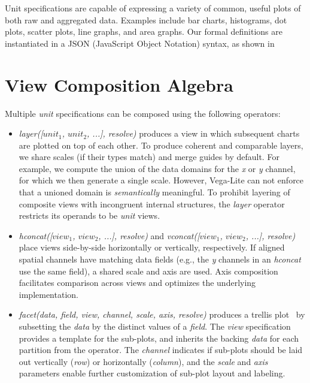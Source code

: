 Unit specifications are capable of expressing a variety of common, useful plots
of both raw and aggregated data. Examples include bar charts, histograms, dot
plots, scatter plots, line graphs, and area graphs. Our formal definitions are
instantiated in a JSON (JavaScript Object Notation) syntax, as shown in

\section{View Composition Algebra}

Multiple \emph{unit} specifications can be composed using the following
operators:

\begin{itemize}
  \item \emph{layer([$unit_1$, $unit_2$, ...], resolve)} produces a view in
  which subsequent charts are plotted on top of each other. To produce coherent
  and comparable layers, we share scales (if their types match) and merge guides
  by default. For example, we compute the union of the data domains for the
  \emph{x} or \emph{y} channel, for which we then generate a single scale.
  However, Vega-Lite can not enforce that a unioned domain is
  \emph{semantically} meaningful. To prohibit layering of composite views with
  incongruent internal structures, the \emph{layer} operator restricts its
  operands to be \emph{unit} views.

  \item \emph{hconcat([$view_1$, $view_2$, ...], resolve)} and
  \emph{vconcat([$view_1$, $view_2$, ...], resolve)} place views side-by-side
  horizontally or vertically, respectively. If aligned spatial channels have
  matching data fields (e.g., the \emph{y} channels in an \emph{hconcat} use the
  same field), a shared scale and axis are used. Axis composition facilitates
  comparison across views and optimizes the underlying implementation.

  \item \emph{facet(data, field, view, channel, scale, axis, resolve)} produces
  a trellis plot~\cite{becker:trellis} by subsetting the \emph{data} by the
  distinct values of a \emph{field}. The \emph{view} specification provides a
  template for the sub-plots, and inherits the backing \emph{data} for each
  partition from the operator. The \emph{channel} indicates if sub-plots should
  be laid out vertically (\emph{row}) or horizontally (\emph{column}), and the
  \emph{scale} and \emph{axis} parameters enable further customization of
  sub-plot layout and labeling.


\end{itemize}
